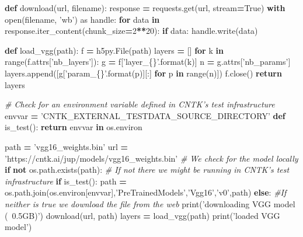\documentclass[]{book}
\newenvironment{Shaded}{\begin{snugshade}}{\end{snugshade}}
\newcommand{\KeywordTok}[1]{\textcolor[rgb]{0.13,0.29,0.53}{\textbf{#1}}}
\newcommand{\DecValTok}[1]{\textcolor[rgb]{0.00,0.00,0.81}{#1}}
\newcommand{\SpecialCharTok}[1]{\textcolor[rgb]{0.00,0.00,0.00}{#1}}
\newcommand{\StringTok}[1]{\textcolor[rgb]{0.31,0.60,0.02}{#1}}
\newcommand{\ImportTok}[1]{#1}
\newcommand{\CommentTok}[1]{\textcolor[rgb]{0.56,0.35,0.01}{\textit{#1}}}
\newcommand{\VariableTok}[1]{\textcolor[rgb]{0.00,0.00,0.00}{#1}}
\newcommand{\ControlFlowTok}[1]{\textcolor[rgb]{0.13,0.29,0.53}{\textbf{#1}}}
\newcommand{\OperatorTok}[1]{\textcolor[rgb]{0.81,0.36,0.00}{\textbf{#1}}}
\newcommand{\BuiltInTok}[1]{#1}
\newcommand{\NormalTok}[1]{#1}
\theoremstyle{definition}
\theoremstyle{definition}
\theoremstyle{definition}
\theoremstyle{remark}
\begin{document}
\begin{Shaded}
\begin{Highlighting}[]
\KeywordTok{def}\NormalTok{ download(url, filename):}
\NormalTok{    response }\OperatorTok{=}\NormalTok{ requests.get(url, stream}\OperatorTok{=}\VariableTok{True}\NormalTok{)}
    \ControlFlowTok{with} \BuiltInTok{open}\NormalTok{(filename, }\StringTok{'wb'}\NormalTok{) }\ImportTok{as}\NormalTok{ handle:}
        \ControlFlowTok{for}\NormalTok{ data }\KeywordTok{in}\NormalTok{ response.iter_content(chunk_size}\OperatorTok{=}\DecValTok{2}\OperatorTok{**}\DecValTok{20}\NormalTok{):}
            \ControlFlowTok{if}\NormalTok{ data: handle.write(data)}


\KeywordTok{def}\NormalTok{ load_vgg(path):}
\NormalTok{    f }\OperatorTok{=}\NormalTok{ h5py.File(path)}
\NormalTok{    layers }\OperatorTok{=}\NormalTok{ []}
    \ControlFlowTok{for}\NormalTok{ k }\KeywordTok{in} \BuiltInTok{range}\NormalTok{(f.attrs[}\StringTok{'nb_layers'}\NormalTok{]):}
\NormalTok{        g }\OperatorTok{=}\NormalTok{ f[}\StringTok{'layer_}\SpecialCharTok{\{\}}\StringTok{'}\NormalTok{.}\BuiltInTok{format}\NormalTok{(k)]}
\NormalTok{        n }\OperatorTok{=}\NormalTok{ g.attrs[}\StringTok{'nb_params'}\NormalTok{]}
\NormalTok{        layers.append([g[}\StringTok{'param_}\SpecialCharTok{\{\}}\StringTok{'}\NormalTok{.}\BuiltInTok{format}\NormalTok{(p)][:] }\ControlFlowTok{for}\NormalTok{ p }\KeywordTok{in} \BuiltInTok{range}\NormalTok{(n)])}
\NormalTok{    f.close()}
    \ControlFlowTok{return}\NormalTok{ layers}

\CommentTok{# Check for an environment variable defined in CNTK's test infrastructure}
\NormalTok{envvar }\OperatorTok{=} \StringTok{'CNTK_EXTERNAL_TESTDATA_SOURCE_DIRECTORY'}
\KeywordTok{def}\NormalTok{ is_test(): }\ControlFlowTok{return}\NormalTok{ envvar }\KeywordTok{in}\NormalTok{ os.environ}

\NormalTok{path }\OperatorTok{=} \StringTok{'vgg16_weights.bin'}
\NormalTok{url }\OperatorTok{=} \StringTok{'https://cntk.ai/jup/models/vgg16_weights.bin'}
\CommentTok{# We check for the model locally}
\ControlFlowTok{if} \KeywordTok{not}\NormalTok{ os.path.exists(path):}
    \CommentTok{# If not there we might be running in CNTK's test infrastructure}
    \ControlFlowTok{if}\NormalTok{ is_test():}
\NormalTok{        path }\OperatorTok{=}\NormalTok{ os.path.join(os.environ[envvar],}\StringTok{'PreTrainedModels'}\NormalTok{,}\StringTok{'Vgg16'}\NormalTok{,}\StringTok{'v0'}\NormalTok{,path)}
    \ControlFlowTok{else}\NormalTok{:}
        \CommentTok{#If neither is true we download the file from the web}
        \BuiltInTok{print}\NormalTok{(}\StringTok{'downloading VGG model (~0.5GB)'}\NormalTok{)}
\NormalTok{        download(url, path)}
\NormalTok{layers }\OperatorTok{=}\NormalTok{ load_vgg(path)}
\BuiltInTok{print}\NormalTok{(}\StringTok{'loaded VGG model'}\NormalTok{)}
\end{Highlighting}
\end{Shaded}
\end{document}
